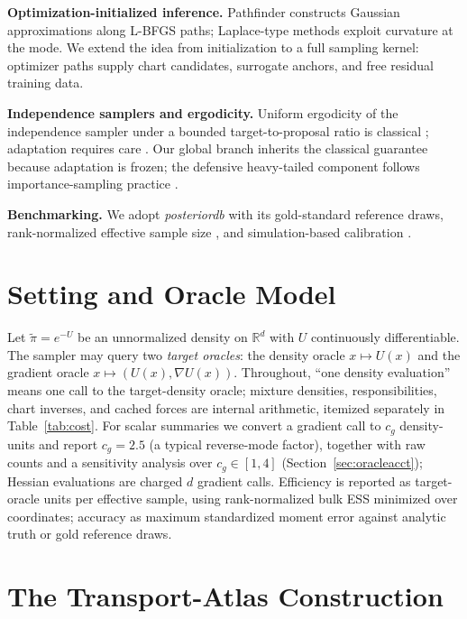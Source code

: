 \documentclass[11pt]{article}
\theoremstyle{remark}
\newcommand{\R}{\mathbb{R}}
\begin{document}
\textbf{Optimization-initialized inference.} Pathfinder \citep{zhang2022}
constructs Gaussian approximations along L-BFGS \citep{liu1989} paths;
Laplace-type methods \citep{rue2009} exploit curvature at the mode. We
extend the idea from initialization to a full sampling kernel: optimizer
paths supply chart candidates, surrogate anchors, and free residual
training data.

\textbf{Independence samplers and ergodicity.} Uniform ergodicity of the
independence sampler under a bounded target-to-proposal ratio is classical
\citep{mengersen1996,tierney1994,roberts2004}; adaptation requires care
\citep{andrieu2008,roberts2007}. Our global branch inherits the classical
guarantee because adaptation is frozen; the defensive heavy-tailed
component follows importance-sampling practice
\citep{hesterberg1995,owen2000}.

\textbf{Benchmarking.} We adopt \emph{posteriordb} \citep{magnusson2024}
with its gold-standard reference draws, rank-normalized effective sample
size \citep{vehtari2021}, and simulation-based calibration
\citep{talts2018}.

\section{Setting and Oracle Model}\label{sec:setting}
Let $\tilde\pi=e^{-U}$ be an unnormalized density on $\R^d$ with $U$
continuously differentiable. The sampler may query two \emph{target
oracles}: the density oracle $x\mapsto U(x)$ and the gradient oracle
$x\mapsto(U(x),\nabla U(x))$. Throughout, ``one density evaluation''
means one call to the target-density oracle; mixture densities,
responsibilities, chart inverses, and cached forces are internal
arithmetic, itemized separately in Table~\ref{tab:cost}. For scalar
summaries we convert a gradient call to $c_g$ density-units and report
$c_g=2.5$ (a typical reverse-mode factor), together with raw counts and a
sensitivity analysis over $c_g\in[1,4]$
(Section~\ref{sec:oracleacct}); Hessian evaluations are charged $d$
gradient calls. Efficiency is reported as target-oracle units per
effective sample, using rank-normalized bulk ESS \citep{vehtari2021}
minimized over coordinates; accuracy as maximum standardized moment error
against analytic truth or gold reference draws.

\section{The Transport-Atlas Construction}\label{sec:construction}
\end{document}
